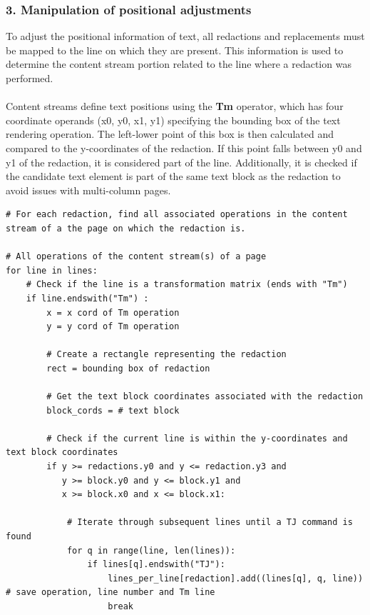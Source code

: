 \subsubsection{3. Manipulation of positional adjustments}
To adjust the positional information of text, all redactions and replacements must be mapped to the line on which they are present. This information is used to determine the content stream portion related to the line where a redaction was performed.
\\\\
Content streams define text positions using the \textbf{Tm} operator, which has four coordinate operands (x0, y0, x1, y1) specifying the bounding box of the text rendering operation. The left-lower point of this box is then calculated and compared to the y-coordinates of the redaction. If this point falls between y0 and y1 of the redaction, it is considered part of the line. Additionally, it is checked if the candidate text element is part of the same text block as the redaction to avoid issues with multi-column pages. 
\begin{lstlisting}[style=CStyle, caption=Pseudocode for identifying lines of text associated with each redaction based on their y-coordinates..]
# For each redaction, find all associated operations in the content stream of a the page on which the redaction is.

# All operations of the content stream(s) of a page
for line in lines: 
    # Check if the line is a transformation matrix (ends with "Tm")
    if line.endswith("Tm") :
        x = x cord of Tm operation
        y = y cord of Tm operation

        # Create a rectangle representing the redaction
        rect = bounding box of redaction

        # Get the text block coordinates associated with the redaction
        block_cords = # text block

        # Check if the current line is within the y-coordinates and text block coordinates
        if y >= redactions.y0 and y <= redaction.y3 and 
           y >= block.y0 and y <= block.y1 and 
           x >= block.x0 and x <= block.x1:

            # Iterate through subsequent lines until a TJ command is found
            for q in range(line, len(lines)):
                if lines[q].endswith("TJ"):
                    lines_per_line[redaction].add((lines[q], q, line)) # save operation, line number and Tm line
                    break

\end{lstlisting}
